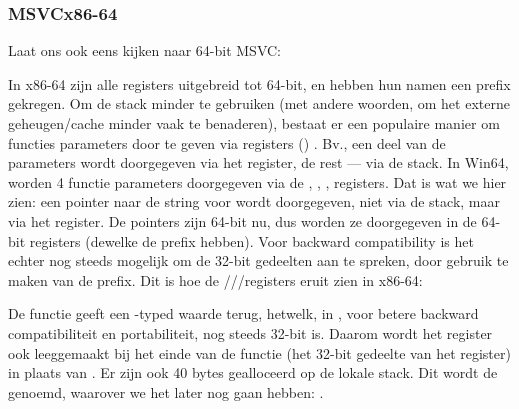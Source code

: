 \subsubsection{MSVC\EMDASH{}x86-64}

Laat ons ook eens kijken naar 64-bit MSVC:




In x86-64 zijn alle registers uitgebreid tot 64-bit, en hebben hun namen een  prefix gekregen.
Om de stack minder te gebruiken (met andere woorden, om het externe geheugen/cache minder vaak te benaderen), bestaat
er een populaire manier om functies parameters door te geven via registers () .
Bv., een deel van de parameters wordt doorgegeven via het register, de rest --- via de stack.
In Win64, worden 4 functie parameters doorgegeven via de \RCX, \RDX, ,  registers.
Dat is wat we hier zien: een pointer naar de string voor \printf wordt doorgegeven, niet via de stack, maar via het \RCX register.
De pointers zijn 64-bit nu, dus worden ze doorgegeven in de 64-bit registers (dewelke de  prefix hebben).
Voor backward compatibility is het echter nog steeds mogelijk om de 32-bit gedeelten aan te spreken, door gebruik te maken van de  prefix.
Dit is hoe de \RAX/\EAX/\AX/\AL registers eruit zien in x86-64:


De \main functie geeft een \Tint{}-typed waarde terug, hetwelk, in \CCpp, voor betere backward compatibiliteit
en portabiliteit, nog steeds 32-bit is. Daarom wordt het \EAX register ook leeggemaakt bij het einde van de functie
(het 32-bit gedeelte van het register) in plaats van \RAX{}.
Er zijn ook 40 bytes gealloceerd op de lokale stack.
Dit wordt de  genoemd, waarover we het later nog gaan hebben: .

